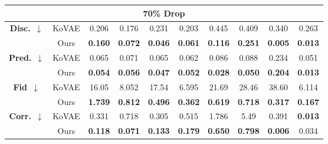 \documentclass{article}
\theoremstyle{plain}
\theoremstyle{definition}
\theoremstyle{remark}
\begin{document}
\begin{table}[!t]
{\begin{tabular}{cc|cccccccc}
    \multicolumn{10}{c}{\textbf{70\% Drop}} \\
    \midrule
    \multirow{2}{*}{\textbf{Disc.}~$\downarrow$}
      & KoVAE 
          & 0.206 
          & 0.176 
          & 0.231 
          & 0.203 
          & 0.445 
          & 0.409 
          & 0.340 
          & 0.263 \\
      & Ours  
          & \cellcolor{blue!10}\textbf{0.160}
          & \cellcolor{blue!10}\textbf{0.072}
          & \cellcolor{blue!10}\textbf{0.046}
          & \cellcolor{blue!10}\textbf{0.061}
          & \cellcolor{blue!10}\textbf{0.116}
          & \cellcolor{blue!10}\textbf{0.251}
          & \cellcolor{blue!10}\textbf{0.005}
          & \cellcolor{blue!10}\textbf{0.013} \\
    \midrule
    \multirow{2}{*}{\textbf{Pred.}~$\downarrow$}
      & KoVAE 
          & 0.065 
          & 0.071 
          & 0.065 
          & 0.062 
          & 0.086 
          & 0.088 
          & 0.234 
          & 0.051 \\
      & Ours  
          & \cellcolor{blue!10}\textbf{0.054}
          & \cellcolor{blue!10}\textbf{0.056}
          & \cellcolor{blue!10}\textbf{0.047}
          & \cellcolor{blue!10}\textbf{0.052}
          & \cellcolor{blue!10}\textbf{0.028}
          & \cellcolor{blue!10}\textbf{0.050}
          & \cellcolor{blue!10}\textbf{0.204}
          & \cellcolor{blue!10}\textbf{0.013} \\
    \midrule
    \multirow{2}{*}{\textbf{Fid}~$\downarrow$}
      & KoVAE 
          & 16.05 
          & 8.052 
          & 17.54 
          & 6.595 
          & 21.69 
          & 28.46 
          & 38.60 
          & 6.114 \\
      & Ours  
          & \cellcolor{blue!10}\textbf{1.739}
          & \cellcolor{blue!10}\textbf{0.812}
          & \cellcolor{blue!10}\textbf{0.496}
          & \cellcolor{blue!10}\textbf{0.362}
          & \cellcolor{blue!10}\textbf{0.619}
          & \cellcolor{blue!10}\textbf{0.718}
          & \cellcolor{blue!10}\textbf{0.317}
          & \cellcolor{blue!10}\textbf{0.167} \\
    \midrule
    \multirow{2}{*}{\textbf{Corr.}~$\downarrow$}
      & KoVAE 
          & 0.331 
          & 0.718 
          & 0.305 
          & 0.515 
          & 1.786 
          & 5.49  
          & 0.391 
          & \cellcolor{blue!10}\textbf{0.013} \\   %
      & Ours  
          & \cellcolor{blue!10}\textbf{0.118}
          & \cellcolor{blue!10}\textbf{0.071}
          & \cellcolor{blue!10}\textbf{0.133}
          & \cellcolor{blue!10}\textbf{0.179}
          & \cellcolor{blue!10}\textbf{0.650}
          & \cellcolor{blue!10}\textbf{0.798}
          & \cellcolor{blue!10}\textbf{0.006}
          & 0.034 \\  %
    \bottomrule
\end{tabular}
}
\end{table}
\end{document}
